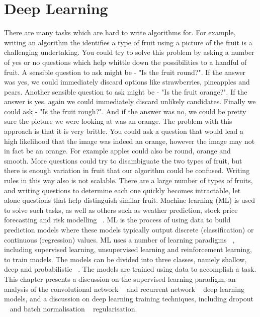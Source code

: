 
\chapter{Deep Learning}

\ifpdf
     \graphicspath{{Figs/Chapter2/}}
\else
    \graphicspath{{Chapter2/Figs/Vector/}{Chapter2/Figs/}}
\fi

There are many tasks which are hard to write algorithms for. For example, writing an algorithm the identifies a type of fruit using a picture of the fruit is a challenging undertaking. You could try to solve this problem by asking a number of yes or no questions which help whittle down the possibilities to a handful of fruit. A sensible question to ask might be - "Is the fruit round?". If the answer was yes, we could immediately discard options like strawberries, pineapples and pears. Another sensible question to ask might be - "Is the fruit orange?". If the answer is yes, again we could immediately discard unlikely candidates. Finally we could ask - "Is the fruit rough?". And if the answer was no, we could be pretty sure the picture we were looking at was an orange. \newline
The problem with this approach is that it is very brittle. You could ask a question that would lead a high likelihood that the image was indeed an orange, however the image may not in fact be an orange. For example apples could also be round, orange and smooth. More questions could try to disambiguate the two types of fruit, but there is enough variation in fruit that our algorithm could be confused. Writing rules in this way also is not scalable. There are a large number of types of fruits, and writing questions to determine each one quickly becomes intractable, let alone questions that help distinguish similar fruit. \newline 
Machine learning (ML) is used to solve such tasks, as well as others such as weather prediction, stock price forecasting and risk modelling ~\citep{hastie2009elements}. ML is the process of using data to build prediction models where these models typically output discrete (classification) or continuous (regression) values. ML uses a number of learning paradigms ~\citep{murphy2012machine}, including supervised learning, unsupervised learning and reinforcement learning, to train models. The models can be divided into three classes, namely shallow, deep and probabilistic ~\citep{hastie2009elements, murphy2012machine}. The models are trained using data to accomplish a task. \newline
\newpage
This chapter presents a discussion on the supervised learning paradigm, an analysis of the convolutional network ~\citep{lecun1998gradient} and recurrent network ~\citep{werbos1988generalization} deep learning models, and a discussion on deep learning training techniques, including dropout ~\citep{srivastava2014dropout} and batch normalisation ~\citep{ioffe2015batch} regularisation. 

